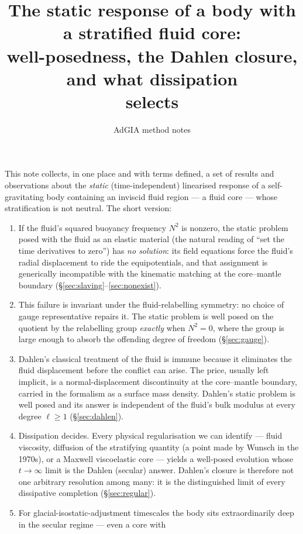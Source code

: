 \documentclass[11pt]{article}
\title{The static response of a body with a stratified fluid core:\\
       well-posedness, the Dahlen closure, and what dissipation\\
       selects}
\author{AdGIA method notes}
\date{}
\begin{document}
\maketitle
\sloppy

\noindent
This note collects, in one place and with terms defined, a set of
results and observations about the \emph{static} (time-independent)
linearised response of a self-gravitating body containing an inviscid
fluid region --- a fluid core --- whose stratification is not neutral.
The short version:

\begin{enumerate}
\item If the fluid's squared buoyancy frequency $N^2$ is nonzero, the
  static problem posed with the fluid as an elastic material (the
  natural reading of ``set the time derivatives to zero'') has
  \emph{no solution}: its field equations force the fluid's radial
  displacement to ride the equipotentials, and that assignment is
  generically incompatible with the kinematic matching at the
  core--mantle boundary (\S\ref{sec:slaving}--\ref{sec:nonexist}).
\item This failure is invariant under the fluid-relabelling symmetry:
  no choice of gauge representative repairs it. The static problem is
  well posed on the quotient by the relabelling group \emph{exactly}
  when $N^2 = 0$, where the group is large enough to absorb the
  offending degree of freedom (\S\ref{sec:gauge}).
\item Dahlen's classical treatment of the fluid is immune because it
  eliminates the fluid displacement before the conflict can arise. The
  price, usually left implicit, is a normal-displacement discontinuity
  at the core--mantle boundary, carried in the formalism as a surface
  mass density. Dahlen's static problem is well posed and its answer
  is independent of the fluid's bulk modulus at every degree
  $\ell \ge 1$ (\S\ref{sec:dahlen}).
\item Dissipation decides. Every physical regularisation we can
  identify --- fluid viscosity, diffusion of the stratifying quantity
  (a point made by Wunsch in the 1970s), or a Maxwell viscoelastic core
  --- yields a well-posed evolution whose $t \to \infty$ limit is the
  Dahlen (secular) answer. Dahlen's closure is therefore not one
  arbitrary resolution among many: it is the distinguished limit of
  every dissipative completion (\S\ref{sec:regular}).
\item For glacial-isostatic-adjustment timescales the body sits
  extraordinarily deep in the secular regime --- even a core with

\end{enumerate}
\end{document}
